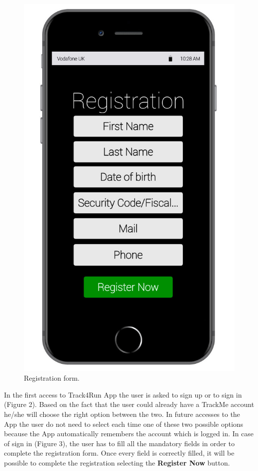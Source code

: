 \begin{enumerate}
\begin{figure}[H]
\begin{center}
\begin{minipage}[c]{.40\textwidth}
          \includegraphics[height=14 cm]{Images/Mockups/Track4RunMockup4.jpg}
	\caption{Registration form.}
        \end{minipage}
      \end{center}
\end{figure}
In the first access to Track4Run App the user is asked to sign up or to sign in 			(Figure 2). Based on the fact that the user could already have a TrackMe account he/she will choose the right option between the two. In future accesses to the App the user do not need to select each time one of these two possible options because the App automatically remembers the account which is logged in. In case of sign in (Figure 3), the user has to fill all the mandatory fields in order to complete the registration form. Once every field is correctly filled, it will be possible to complete the registration selecting the \textbf{Register Now} button. 
\clearpage
\begin{figure}[H]
\begin{center}
        \begin{minipage}[c]{.40\textwidth}
        \centering

\end{minipage}
\end{center}
\end{figure}
\end{enumerate}
